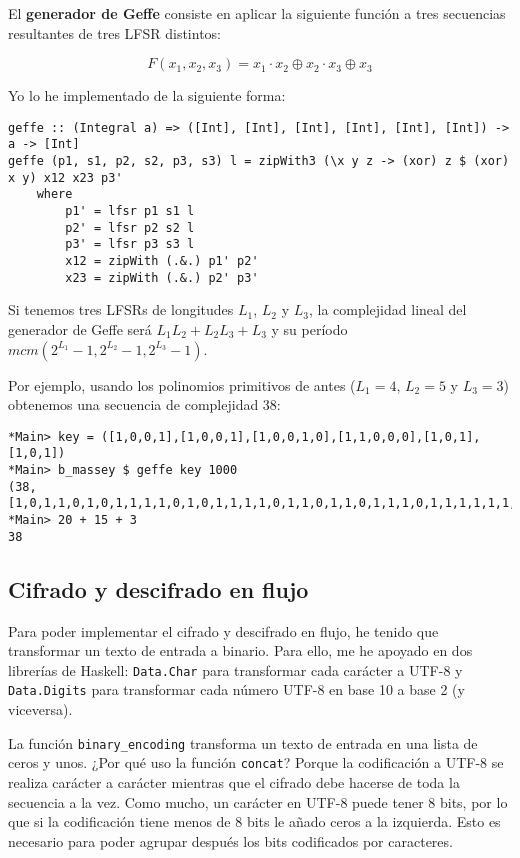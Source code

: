 \documentclass[10pt,spanish]{article}
\begin{document}
El \textbf{\textcolor{azul}{generador de Geffe}} consiste en aplicar la siguiente función a tres secuencias resultantes de tres LFSR distintos:

\begin{displaymath}
    F(x_1, x_2, x_3) = x_1 \cdot x_2 \oplus x_2 \cdot x_3 \oplus x_3
\end{displaymath}

Yo lo he implementado de la siguiente forma:

\begin{verbatim}
geffe :: (Integral a) => ([Int], [Int], [Int], [Int], [Int], [Int]) -> a -> [Int]
geffe (p1, s1, p2, s2, p3, s3) l = zipWith3 (\x y z -> (xor) z $ (xor) x y) x12 x23 p3'
    where
        p1' = lfsr p1 s1 l
        p2' = lfsr p2 s2 l
        p3' = lfsr p3 s3 l
        x12 = zipWith (.&.) p1' p2'
        x23 = zipWith (.&.) p2' p3'
\end{verbatim}

Si tenemos tres LFSRs de longitudes $L_1$, $L_2$ y $L_3$, la complejidad lineal del generador de Geffe será $L_1 L_2 + L_2 L_3 + L_3$ y su período $mcm(2^{L_1} - 1, 2^{L_2} -1, 2^{L_3} - 1)$.

Por ejemplo, usando los polinomios primitivos de antes ($L_1 = 4$, $L_2 = 5$ y $L_3 = 3$) obtenemos una secuencia de complejidad $38$:

\begin{verbatim}
*Main> key = ([1,0,0,1],[1,0,0,1],[1,0,0,1,0],[1,1,0,0,0],[1,0,1],[1,0,1])
*Main> b_massey $ geffe key 1000
(38,[1,0,1,1,0,1,0,1,1,1,1,0,1,0,1,1,1,1,0,1,1,0,1,1,0,1,1,1,0,1,1,1,1,1,1,1,0,1,1])
*Main> 20 + 15 + 3
38
\end{verbatim}

\subsection{\textcolor{azul}Cifrado y descifrado en flujo}
Para poder implementar el cifrado y descifrado en flujo, he tenido que transformar un texto de entrada a binario. Para ello, me he apoyado en dos librerías de Haskell: \texttt{Data.Char} para transformar cada carácter a UTF-8 y \texttt{Data.Digits} para transformar cada número UTF-8 en base 10 a base 2 (y viceversa).

La función \texttt{binary\_encoding} transforma un texto de entrada en una lista de ceros y unos. ¿Por qué uso la función \texttt{concat}? Porque la codificación a UTF-8 se realiza carácter a carácter mientras que el cifrado debe hacerse de toda la secuencia a la vez. Como mucho, un carácter en UTF-8 puede tener 8 bits, por lo que si la codificación tiene menos de 8 bits le añado ceros a la izquierda. Esto es necesario para poder agrupar después los bits codificados por caracteres.
\end{document}
